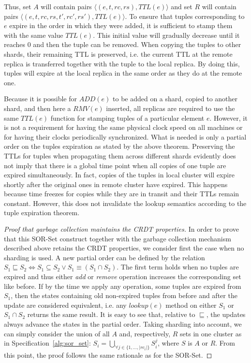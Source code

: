 Thus, set $A$ will contain pairs $\langle(e, t, rc, rs), TTL(e)\rangle$ and set
$R$ will contain pairs $\langle(e, t, rc, rs, t', rc', rs'), TTL(e)\rangle$. To
ensure that tuples corresponding to $e$ expire in the order in which they were
added, it is sufficient to stamp them with the same value $TTL(e)$. This initial
value will gradually decrease until it reaches 0 and then the tuple can be
removed. When copying the tuples to other shards, their remaining TTL is
preserved, i.e. the current TTL at the remote replica is transferred together
with the tuple to the local replica. By doing this, tuples will expire at the
local replica in the same order as they do at the remote one.

Because it is possible for $ADD(e)$ to be added on a shard, copied to another
shard, and then here a $RMV(e)$ inserted, all replicas are required to use the
same $TTL(e)$ function for stamping tuples of a particular element $e$. However,
it is not a requirement for having the same physical clock speed on all machines
or for having their clocks periodically synchronized. What is needed is only a
partial order on the tuples expiration as stated by the above theorem.
Preserving the TTLs for tuples when propagating them across different shards
evidently does not imply that there is a global time point when all copies of
one tuple are expired simultaneously. In fact, copies of the tuples in local
cluster will expire shortly after the original ones in remote cluster have
expired. This happens because time freezes for copies while they are in transit
and their TTLs remain constant. However, this does not invalidate the lookup
semantics according to the tuple expiration theorem.

\begin{proof}[Proof that garbage collection maintains the CRDT properties]
In order to prove that this SOR-Set construct together with the garbage
collection mechanism described above retains the CRDT properties, we consider
first the case when no sharding is used. A new partial order can be defined by
the relation $S_{1} \sqsubseteq S_{2} \iff S_{1} \subseteq S_{2} \lor S_{1}
\equiv (S_{1} \cap S_{2})$. The first term holds when no tuples are expired and
thus either \textit{add} or \textit{remove} operation increases the
corresponding set like before. If by the time we apply any operation, some
tuples are expired from $S_{1}$, then the states containing old non-expired
tuples from before and after the update are considered equivalent, i.e. any
$\textit{lookup}(e)$ method on either $S_{1}$ or $S_{1} \cap S_{2}$ returns the
same result. It is easy to see that, relative to $\sqsubseteq$, the updates
always advance the states in the partial order. Taking sharding into account, we
can simply consider the union of all $A$ and, respectively, $R$ sets in one
cluster as in Specification~\ref{alg:sor_set}: $S_{i} = \bigcup_{\forall j \in
\{1,\ldots,|rc_{i}|\}} S_{i}^{j}$, where $S$ is $A$ or $R$. From this point, the
proof follows the same rationale as for the SOR-Set.
\end{proof}
